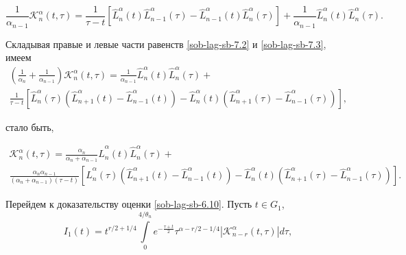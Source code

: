 \begin{equation}
\frac{1}{\alpha_{n-1}}\mathcal{K}_n^\alpha (t,\tau) =
\frac{1}{\tau - t}
\left[
\hat{L}_{n}^{\alpha}(t) \hat{L}_{n-1}^{\alpha}(\tau) - \hat{L}_{n-1}^{\alpha}(t)\hat{L}_{n}^\alpha (\tau)
\right]
+\frac{1}{\alpha_{n-1}}\hat{L}_n^\alpha(t)\hat{L}_n^\alpha(\tau).
\label{sob-lag-sb-7.3}
\end{equation}

Складывая правые и левые части равенств \eqref{sob-lag-sb-7.2} и \eqref{sob-lag-sb-7.3}, имеем
\begin{multline*}
\left(\frac{1}{\alpha_n} + \frac{1}{\alpha_{n-1}}\right)\mathcal{K}_n^\alpha(t,\tau) = \frac{1}{\alpha_{n-1}}\hat{L}_{n}^{\alpha}(t)\hat{L}_{n}^{\alpha}(\tau) +\\
\frac{1}{\tau - t}
\left[
\hat{L}_n^\alpha(\tau)\left(\hat{L}_{n+1}^\alpha(t) - \hat{L}_{n-1}^\alpha(t)\right)-
\hat{L}_{n}^\alpha(t)\left(\hat{L}_{n+1}^{\alpha}(\tau) - \hat{L}_{n-1}^{\alpha}(\tau)\right)
\right],
\end{multline*}

стало быть,

\begin{multline}
\mathcal{K}_n^\alpha(t,\tau) =
\frac{\alpha_n}{\alpha_n + \alpha_{n-1}}
\hat{L}_{n}^{\alpha}(t)\hat{L}_{n}^{\alpha}(\tau) +\\
\frac{\alpha_n\alpha_{n-1}}{(\alpha_n+\alpha_{n-1})(\tau - t)}
\left[
\hat{L}_n^\alpha(\tau)\left(\hat{L}_{n+1}^\alpha(t) - \hat{L}_{n-1}^\alpha(t)\right) -
\hat{L}_n^\alpha(t)\left(\hat{L}_{n+1}^\alpha(\tau) - \hat{L}_{n-1}^\alpha(\tau)\right)
\right].
\label{sob-lag-sb-7.4}
\end{multline}

Перейдем к доказательству оценки \eqref{sob-lag-sb-6.10}. Пусть $t \in G_1$,
\begin{equation}
  I_1(t) = t^{r/2+1/4}\int\limits_{0}^{4/\theta_n}
  e^{-\frac{\tau+t}{2}}\tau^{\alpha - r/2 - 1/4} \left| \mathcal{K}_{n-r}^\alpha(t, \tau) \right| d\tau,
\label{sob-lag-sb-7.5}
\end{equation}

